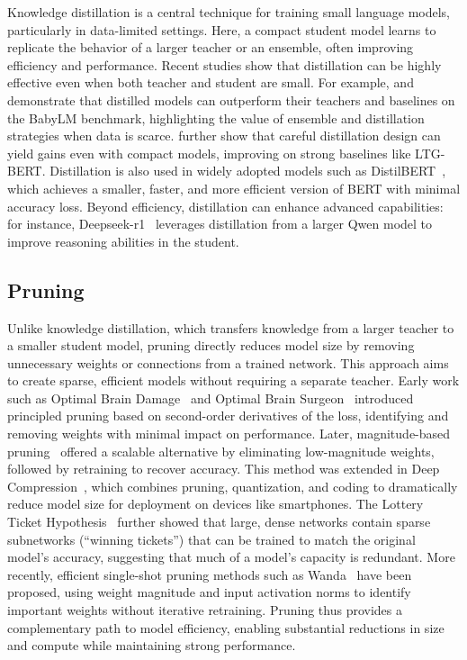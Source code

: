 Knowledge distillation is a central technique for training small language models, particularly in data-limited settings. Here, a compact student model learns to replicate the behavior of a larger teacher or an ensemble, often improving efficiency and performance.
Recent studies show that distillation can be highly effective even when both teacher and student are small. For example, \citet{timiryasov2023baby} and \citet{tastet2024babyllama2} demonstrate that distilled models can outperform their teachers and baselines on the BabyLM benchmark, highlighting the value of ensemble and distillation strategies when data is scarce. \citet{yam2024tinyminds} further show that careful distillation design can yield gains even with compact models, improving on strong baselines like LTG-BERT.
Distillation is also used in widely adopted models such as DistilBERT~\citep{sanh2019distilbert}, which achieves a smaller, faster, and more efficient version of BERT with minimal accuracy loss. Beyond efficiency, distillation can enhance advanced capabilities: for instance, Deepseek-r1~\citep{guo2025deepseekr1} leverages distillation from a larger Qwen model to improve reasoning abilities in the student.

\subsection{Pruning}

Unlike knowledge distillation, which transfers knowledge from a larger teacher to a smaller student model, pruning directly reduces model size by removing unnecessary weights or connections from a trained network. This approach aims to create sparse, efficient models without requiring a separate teacher.
Early work such as Optimal Brain Damage~\citep{lecun1990optimal} and Optimal Brain Surgeon~\citep{hassibi1993optimal} introduced principled pruning based on second-order derivatives of the loss, identifying and removing weights with minimal impact on performance. Later, magnitude-based pruning~\citep{han2015learning} offered a scalable alternative by eliminating low-magnitude weights, followed by retraining to recover accuracy. This method was extended in Deep Compression~\citep{han2016deep}, which combines pruning, quantization, and coding to dramatically reduce model size for deployment on devices like smartphones.
The Lottery Ticket Hypothesis~\citep{frankle2019lottery} further showed that large, dense networks contain sparse subnetworks (“winning tickets”) that can be trained to match the original model's accuracy, suggesting that much of a model's capacity is redundant. More recently, efficient single-shot pruning methods such as Wanda~\citep{sun2024simple} have been proposed, using weight magnitude and input activation norms to identify important weights without iterative retraining.
Pruning thus provides a complementary path to model efficiency, enabling substantial reductions in size and compute while maintaining strong performance.

